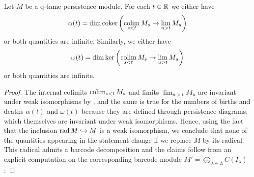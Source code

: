\begin{lem}
\label{lem:birth_death_formulas}
	Let $M$ be a q-tame persistence module.
	For each $t \in \mathbb{R}$ we either have
	\[
		\alpha(t) = \dim \operatorname{coker} \left( \operatorname*{colim}_{s < t} M_{s} \to \lim_{u > t} M_{u} \right)
	\]
	or both quantities are infinite.
	Similarly, we either have
	\[
		\omega(t) = \dim \ker \left( \operatorname*{colim}_{s < t} M_{s} \to \lim_{u > t} M_{u} \right)
	\]
	or both quantities are infinite.
\end{lem}
\begin{proof}
    The internal colimits $\operatorname*{colim}_{s < t} M_{s}$ and limits $\lim_{u > t} M_{u}$ are invariant under weak isomorphisms by \cite[Lemmas 3.5 and 3.6]{Schmahl.2021}, and the same is true for the numbers of births and deaths $\alpha(t)$ and $\omega(t)$ because they are defined through persistence diagrams, which themselves are invariant under weak isomorphisms.
	Hence, using the fact that the inclusion $\operatorname{rad} M \hookrightarrow M$ is a weak isomorphism, we conclude that none of the quantities appearing in the statement change if we replace $M$ by its radical.
	This radical admits a barcode decomposition and the claims follow from an explicit computation on the corresponding barcode module $M' = \bigoplus_{\lambda \in \Lambda} C(I_\lambda)$:
	

\end{proof}
